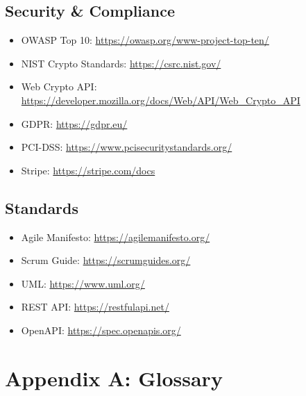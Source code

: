 \documentclass[12pt,a4paper]{article}
\begin{document}
\subsection*{Security \& Compliance}
\begin{itemize}[leftmargin=*]
  \item OWASP Top 10: \url{https://owasp.org/www-project-top-ten/}
  \item NIST Crypto Standards: \url{https://csrc.nist.gov/}
  \item Web Crypto API: \url{https://developer.mozilla.org/docs/Web/API/Web_Crypto_API}
  \item GDPR: \url{https://gdpr.eu/}
  \item PCI-DSS: \url{https://www.pcisecuritystandards.org/}
  \item Stripe: \url{https://stripe.com/docs}
\end{itemize}

\subsection*{Standards}
\begin{itemize}[leftmargin=*]
  \item Agile Manifesto: \url{https://agilemanifesto.org/}
  \item Scrum Guide: \url{https://scrumguides.org/}
  \item UML: \url{https://www.uml.org/}
  \item REST API: \url{https://restfulapi.net/}
  \item OpenAPI: \url{https://spec.openapis.org/}
\end{itemize}

\appendix
\section*{Appendix A: Glossary}
\end{document}
